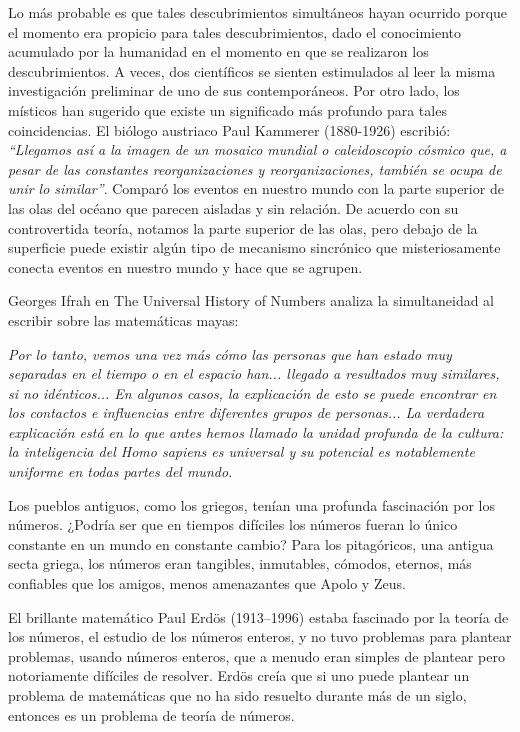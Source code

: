 \documentclass{article}
\begin{document}
Lo más probable es que tales descubrimientos simultáneos hayan ocurrido porque
el momento era propicio para tales descubrimientos, dado el conocimiento
acumulado por la humanidad en el momento en que se realizaron los
descubrimientos. A veces, dos científicos se sienten estimulados al leer la
misma investigación preliminar de uno de sus contemporáneos. Por otro lado, los
místicos han sugerido que existe un significado más profundo para tales
coincidencias. El biólogo austriaco Paul Kammerer (1880-1926) escribió:
\textit{“Llegamos así a la imagen de un mosaico mundial o caleidoscopio cósmico que, a
pesar de las constantes reorganizaciones y reorganizaciones, también se ocupa de
unir lo similar”}. Comparó los eventos en nuestro mundo con la parte superior de
las olas del océano que parecen aisladas y sin relación. De acuerdo con su
controvertida teoría, notamos la parte superior de las olas, pero debajo de la
superficie puede existir algún tipo de mecanismo sincrónico que misteriosamente
conecta eventos en nuestro mundo y hace que se agrupen.

Georges Ifrah en The Universal History of Numbers analiza la simultaneidad al
escribir sobre las matemáticas mayas:

\textit{Por lo tanto, vemos una vez más cómo las personas que han estado muy separadas
en el tiempo o en el espacio han... llegado a resultados muy similares, si no
idénticos... En algunos casos, la explicación de esto se puede encontrar en los
contactos e influencias entre diferentes grupos de personas... La verdadera
explicación está en lo que antes hemos llamado la unidad profunda de la cultura:
la inteligencia del Homo sapiens es universal y su potencial es notablemente
uniforme en todas partes del mundo.}

Los pueblos antiguos, como los griegos, tenían una profunda fascinación por los
números. ¿Podría ser que en tiempos difíciles los números fueran lo único
constante en un mundo en constante cambio? Para los pitagóricos, una antigua
secta griega, los números eran tangibles, inmutables, cómodos, eternos, más
confiables que los amigos, menos amenazantes que Apolo y Zeus.

El brillante matemático Paul Erdös (1913–1996) estaba fascinado por la teoría de
los números, el estudio de los números enteros, y no tuvo problemas para
plantear problemas, usando números enteros, que a menudo eran simples de
plantear pero notoriamente difíciles de resolver. Erdös creía que si uno puede
plantear un problema de matemáticas que no ha sido resuelto durante más de un
siglo, entonces es un problema de teoría de números.
\end{document}
